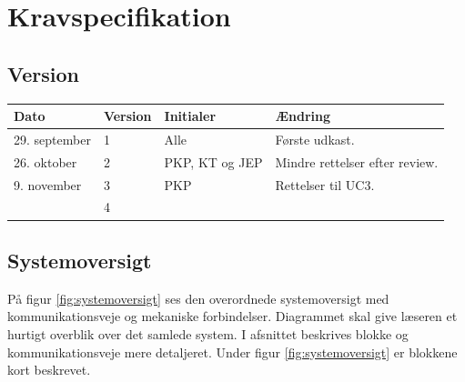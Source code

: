 \chapter{Kravspecifikation} \label{ch:kravspecifikation}
\section*{Version}
\begin{table}[h]
	\centering
	\begin{tabularx}{\textwidth - 2cm}{|l|l|l|X|}
	\hline
	Dato			& Version			& Initialer 		& Ændring										\\ \hline
	29. september 	& 1 				& Alle				& Første udkast. 								\\ \hline
	26. oktober		& 2 				& PKP, KT og JEP	& Mindre rettelser efter review.				\\ \hline
	9. november		& 3 				& PKP				& Rettelser til UC3. 							\\ \hline
					& 4 				&  					& 												\\ \hline
	\end{tabularx}
\end{table}
\clearpage



\section{Systemoversigt} \label{sec:systemoversigt}
På figur \ref{fig:systemoversigt} ses den overordnede systemoversigt med kommunikationsveje og mekaniske forbindelser. Diagrammet skal give læseren et hurtigt overblik over det samlede system. I afsnittet %
beskrives blokke og kommunikationsveje mere detaljeret. Under figur \ref{fig:systemoversigt} er blokkene kort beskrevet. 

